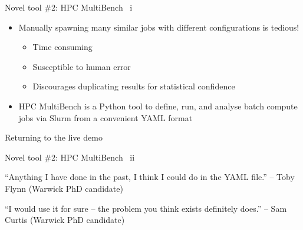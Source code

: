 \documentclass[10pt,aspectratio=169]{beamer}
\begin{document}
\begin{frame}{Novel tool \#2: HPC MultiBench \ i}
    \begin{itemize}
        \item<1-> Manually spawning many similar jobs with different configurations is tedious!
        \begin{itemize}
            \item Time consuming
            \item Susceptible to human error
            \item Discourages duplicating results for statistical confidence
        \end{itemize}
        \vspace{0.5cm}
        \item<2-> HPC MultiBench is a Python tool to define, run, and analyse batch compute jobs via Slurm from a convenient YAML format
    \end{itemize}
\end{frame}

\begin{frame}[t,label=demo]{Returning to the live demo}
    
    \hyperlink{backup}{}
\end{frame}

\begin{frame}{Novel tool \#2: HPC MultiBench \ ii}
    \vspace{0.2cm}
    \large\begin{displayquote}
        ``Anything I have done in the past, I think I could do in the YAML file.''\newline
        \hspace*{0.5cm}-- Toby Flynn (Warwick PhD candidate)
    \end{displayquote}
    \vspace{1cm}
    \large\begin{displayquote}
        ``I would use it for sure -- the problem you think exists definitely does.''\newline
        \hspace*{0.5cm} -- Sam Curtis (Warwick PhD candidate)
    \end{displayquote}
\end{frame}
\end{document}
